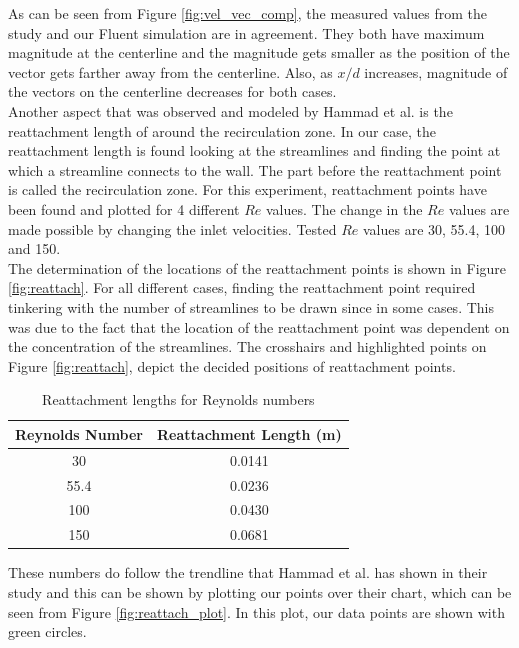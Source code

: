 \vspace{0.5cm}
\noindent As can be seen from Figure \ref{fig:vel_vec_comp}, the measured values from the study and our Fluent simulation are in agreement. They both have maximum magnitude at the centerline and the magnitude gets smaller as the position of the vector gets farther away from the centerline. Also, as $x/d$ increases, magnitude of the vectors on the centerline decreases for both cases.
\\

\noindent Another aspect that was observed and modeled by Hammad et al. is the reattachment length of around the recirculation zone. In our case, the reattachment length is found looking at the streamlines and finding the point at which a streamline connects to the wall. The part before the reattachment point is called the recirculation zone. For this experiment, reattachment points have been found and plotted for 4 different $Re$ values. The change in the $Re$ values are made possible by changing the inlet velocities. Tested $Re$ values are 30, 55.4, 100 and 150.\\



\noindent The determination of the locations of the reattachment points is shown in Figure \ref{fig:reattach}. For all different cases, finding the reattachment point required tinkering with the number of streamlines to be drawn since in some cases. This was due to the fact that the location of the reattachment point was dependent on the concentration of the streamlines. The crosshairs and highlighted points on Figure \ref{fig:reattach}, depict the decided positions of reattachment points.


\begin{table}[H]
\caption{Reattachment lengths for Reynolds numbers}
\centering
\begin{tabular}{c|c}
\hline
Reynolds Number & Reattachment Length (m) \\ \hline
30              & 0.0141                  \\
55.4            & 0.0236                  \\
100             & 0.0430                  \\
150             & 0.0681                 
\end{tabular}
\end{table}

\noindent These numbers do follow the trendline that Hammad et al. has shown in their study and this can be shown by plotting our points over their chart, which can be seen from Figure \ref{fig:reattach_plot}. In this plot, our data points are shown with green circles. 

